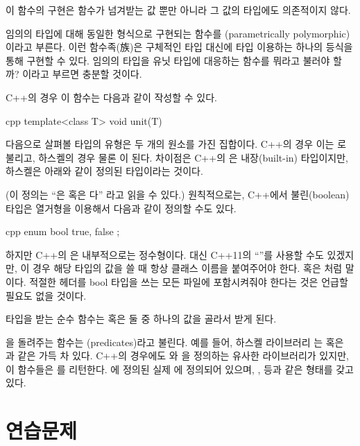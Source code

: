 이 함수의 구현은 함수가 넘겨받는 값 뿐만 아니라 그 값의 타입에도 의존적이지 않다.

임의의 타입에 대해 동일한 형식으로 구현되는 함수를 \trParameter\trPolymorphic(parametrically polymorphic)이라고 부른다.
이런 함수족(族)은 구체적인 타입 대신에 타입 \trParameter\를 이용하는 하나의 등식을 통해 구현할 수 있다.
임의의 타입을 유닛 타입에 대응하는 \trPolymorphic 함수를 뭐라고 불러야 할까?  이라고 부르면 충분할 것이다.


C++의 경우 이 함수는 다음과 같이 작성할 수 있다.

\begin{snip}{cpp}
template<class T>
void unit(T) {}
\end{snip}

다음으로 살펴볼 타입의 유형은 두 개의 원소를 가진 집합이다. C++의 경우 이는 로 불리고, 하스켈의 경우 물론 이 된다.
차이점은 C++의 은 내장(built-in) 타입이지만, 하스켈은 아래와 같이 정의된 타입이라는 것이다.

(이 정의는 ``은  혹은 다'' 라고 읽을 수 있다.)
원칙적으로는, C++에서 불린(boolean) 타입은 열거형을 이용해서 다음과 같이 정의할 수도 있다.

\begin{snip}{cpp}
enum bool { 
    true,
    false
};
\end{snip}
하지만 C++의 은 내부적으로는 정수형이다. 대신 C++11의 ``''를 사용할 수도 있겠지만, 이 경우 해당 타입의 값을 쓸 때 항상 클래스 이름을 붙여주어야 한다.
 혹은 처럼 말이다. 적절한 헤더를 bool 타입을 쓰는 모든 파일에 포함시켜줘야 한다는 것은 언급할 필요도 없을 것이다.

 타입을 받는 순수 함수는  혹은  둘 중 하나의 값을 골라서 받게 된다.

을 돌려주는 함수는 \newterm{\trPredicates}(predicates)라고 불린다.
예를 들어, 하스켈 라이브러리 는  혹은 과 같은 \trPredicates\로 가득 차 있다.
C++의 경우에도 와 을 정의하는 유사한 라이브러리가 있지만, 이 함수들은 를 리턴한다.
에 정의된 실제 \trPredicates\는 에 정의되어 있으며, ,  등과 같은 형태를 갖고 있다.

\section{연습문제}

